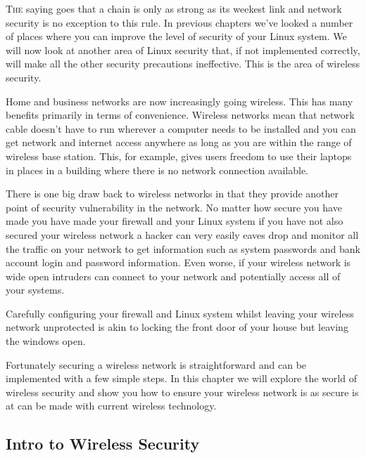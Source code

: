 \lettrine[lines=3, findent=3pt, nindent=0pt]{T}{he} saying goes that a chain is
only as strong as its weekest link and network security is no exception to this
rule. In previous chapters we've looked a number of places where you can improve
the level of security of your Linux system. We will now look at another area of
Linux security that, if not implemented correctly, will make all the other
security precautions ineffective.  This is the area of wireless security.



Home and business networks are now increasingly going wireless. This has many
benefits primarily in terms of convenience. Wireless networks mean that network
cable doesn't have to run wherever a computer needs to be installed and you can
get network and internet access anywhere as long as you are within the range of
wireless base station. This, for example, gives users freedom to use their
laptops in places in a building where there is no network connection available.



There is one big draw back to wireless networks in that they provide another
point of security vulnerability in the network. No matter how secure you have
made you have made your firewall and your Linux system if you have not also
secured your wireless network a hacker can very easily eaves drop and monitor
all the traffic on your network to get information such as system passwords and
bank account login and password information. Even worse, if your wireless
network is wide open intruders can connect to your network and potentially
access all of your systems.



Carefully configuring your firewall and Linux system whilst leaving your
wireless network unprotected is akin to locking the front door of your house but
leaving the windows open.



Fortunately securing a wireless network is straightforward and can be
implemented with a few simple steps. In this chapter we will explore the world
of wireless security and show you how to ensure your wireless network is as
secure is at can be made with current wireless technology. 



\subsection{Intro to Wireless Security}
\label{ssec:intro_to_wireless_security}

